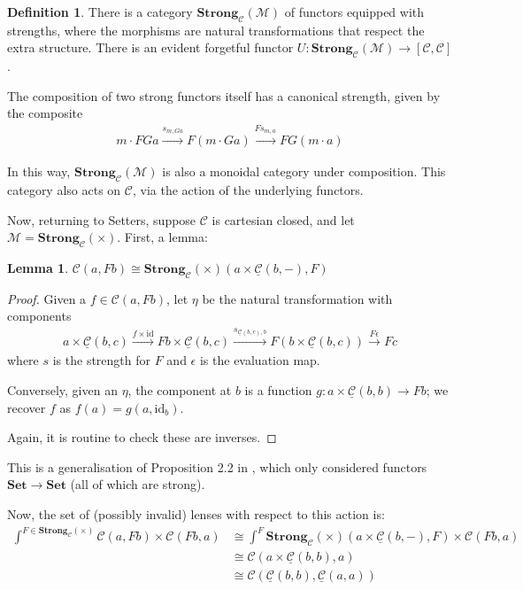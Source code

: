 \documentclass[11pt,a4paper]{amsart}
\theoremstyle{plain}
\newtheorem{lemma}[theorem]{Lemma}
\theoremstyle{definition}
\newtheorem{definition}[theorem]{Definition}
\newcommand{\id}{\mathrm{id}}
\newcommand{\C}{\mathscr{C}}
\newcommand{\homC}{\underline{\C}}
\newcommand{\M}{\mathscr{M}}
\newcommand{\Set}{\mathbf{Set}}
\newcommand{\Strong}{\mathbf{Strong}}
\begin{document}
\begin{definition}
There is a category $\Strong_\C(\M)$ of functors equipped with strengths, where the morphisms are natural transformations that respect the extra structure. There is an evident forgetful functor $U : \Strong_\C(\M) \to [\C, \C]$.
\end{definition}

The composition of two strong functors itself has a canonical strength, given by the composite
\begin{align*}
m \cdot FG a \xrightarrow{s_{m, Ga}} F(m \cdot G a) \xrightarrow{Fs_{m,a}} FG (m \cdot a)
\end{align*}

In this way, $\Strong_\C(\M)$ is also a monoidal category under composition. This category also acts on $\C$, via the action of the underlying functors.

Now, returning to Setters, suppose $\C$ is cartesian closed, and let $\M = \Strong_\C(\times)$. First, a lemma:

\begin{lemma}
$\C(a, Fb) \cong \Strong_\C(\times)(a \times \homC(b, -), F)$
\end{lemma}
\begin{proof}
Given a $f \in \C(a, Fb)$, let $\eta$ be the natural transformation with components
\begin{align*}
a \times \homC(b, c) \xrightarrow{f \times \id} Fb \times \homC(b, c) \xrightarrow{s_{\homC(b, c), b}}  F(b \times \homC(b, c)) \xrightarrow{F\epsilon} Fc
\end{align*}
where $s$ is the strength for $F$ and $\epsilon$ is the evaluation map.

Conversely, given an $\eta$, the component at $b$ is a function $g : a \times \homC(b, b) \to Fb$; we recover $f$ as $f(a) = g(a, \id_b)$.

Again, it is routine to check these are inverses.
\end{proof}

This is a generalisation of Proposition 2.2 in \cite{MR3482285}, which only considered functors $\Set \to \Set$ (all of which are strong).

Now, the set of (possibly invalid) lenses with respect to this action is:
\begin{align*}
\int^{F \in \Strong_\C(\times)} \C(a, F b) \times \C(F b, a) 
&\cong \int^{F} \Strong_\C(\times)(a \times \homC(b, -), F) \times \C(F b, a) \\ 
&\cong \C(a \times \homC(b, b), a) \\
&\cong \C(\homC(b, b), \homC(a, a))
\end{align*}
\end{document}
